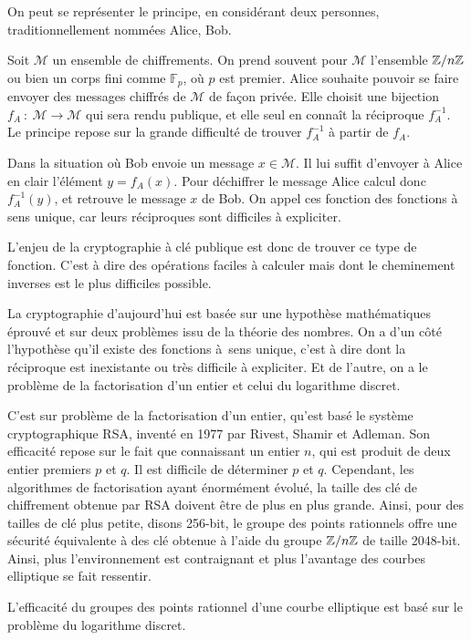 On peut se représenter le principe, en considérant deux personnes, traditionnellement
nommées
Alice, Bob.

Soit $\mathcal{M}$ un ensemble de chiffrements. On prend souvent pour $\mathcal{M}$
l'ensemble $\mathbb{Z} / n \mathbb{Z}$ ou bien un corps fini comme $\mathbb{F}_{p}$, où $p$ est
premier. Alice souhaite pouvoir se faire envoyer des
messages chiffrés de $\mathcal{M}$ de façon privée. Elle choisit une bijection $f_{A}\ :\
\mathcal{M}\to \mathcal{M}$ qui sera rendu publique, et elle seul en connaît la réciproque
$f_{A}^{-1}$. Le principe repose sur la grande difficulté de trouver $f_{A}^{-1}$ à partir de
$f_{A}$. 

Dans la situation où Bob envoie un message $x \in \mathcal{M}$. Il lui suffit
d'envoyer à Alice en clair l'élément $y = f_{A}(x)$. Pour déchiffrer le message Alice
calcul donc $f_{A}^{-1}(y)$, et retrouve le message $x$ de Bob. On appel ces fonction des fonctions à sens unique, car leurs réciproques sont difficiles à expliciter.

L'enjeu de la cryptographie à clé publique est donc de trouver ce type de fonction.
C'est à dire des opérations faciles à calculer mais dont le cheminement inverses est le plus
difficiles possible.

La cryptographie d'aujourd'hui est basée sur une hypothèse mathématiques éprouvé et sur deux
problèmes issu de la théorie des nombres. On a d'un côté l'hypothèse qu'il existe des
fonctions à sens unique, c'est à dire dont la réciproque est inexistante ou très difficile à
expliciter. Et de l'autre, on a
le problème de la factorisation d'un entier et celui du logarithme discret.

C'est sur problème de la factorisation d'un entier, qu'est basé le système cryptographique RSA, inventé en 1977 par Rivest,
Shamir et Adleman. Son efficacité repose sur le fait que connaissant un entier $n$, qui
est produit de deux entier premiers $p$ et $q$. Il est difficile de déterminer $p$ et
$q$. Cependant, les algorithmes de factorisation ayant énormément évolué, la taille des
clé de chiffrement obtenue par RSA doivent être de plus en plus grande. Ainsi, pour des
tailles de clé plus petite, disons 256-bit, le groupe des points rationnels offre une sécurité équivalente à
des clé obtenue à l'aide du groupe $\mathbb{Z} / n\mathbb{Z}$ de taille 2048-bit. Ainsi, plus l'environnement
est contraignant et plus l'avantage des courbes elliptique se fait ressentir.

L'efficacité du groupes des points rationnel d'une courbe elliptique est basé sur le
problème du logarithme discret. 

